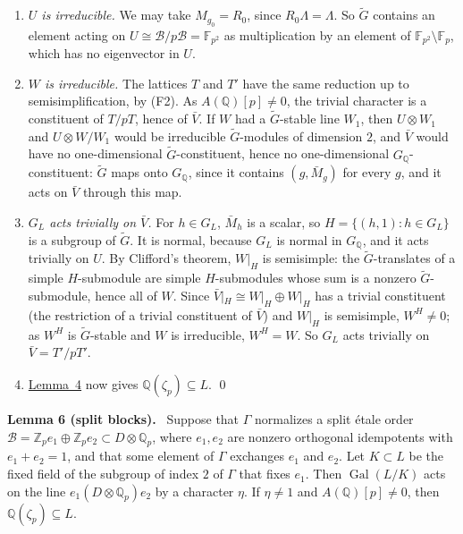 \documentclass[11pt]{article}
\newenvironment{statement}[1]{\par\medskip\noindent\phantomsection\textbf{#1}\ }{\par\medskip}
\newcommand{\Q}{\mathbb Q}
\newcommand{\Z}{\mathbb Z}
\newcommand{\F}{\mathbb F}
\DeclareMathOperator{\Gal}{Gal}
\begin{document}
\begin{enumerate}
\item \emph{\(U\) is irreducible.} We may take \(M_{g_0}=R_0\), since \(R_0\Lambda=\Lambda\). So
\(\tilde G\) contains an element acting on \(U\cong\mathcal B/p\mathcal B=\F_{p^2}\) as multiplication by an
element of \(\F_{p^2}\setminus\F_p\), which has no eigenvector in \(U\).

\item \emph{\(W\) is irreducible.} The lattices \(T\) and \(T'\) have the same reduction up to
semisimplification, by (F2). As \(A(\Q)[p]\neq0\), the trivial character is a constituent of
\(T/pT\), hence of \(\bar V\). If \(W\) had a \(\tilde G\)-stable line \(W_1\), then
\(U\otimes W_1\) and \(U\otimes W/W_1\) would be irreducible \(\tilde G\)-modules of dimension \(2\),
and \(\bar V\) would have no one-dimensional \(\tilde G\)-constituent, hence no one-dimensional
\(G_{\Q}\)-constituent: \(\tilde G\) maps onto \(G_{\Q}\), since it contains \((g,\bar M_g)\) for
every \(g\), and it acts on \(\bar V\) through this map.

\item \emph{\(G_L\) acts trivially on \(\bar V\).} For \(h\in G_L\), \(\bar M_h\) is a scalar, so
\(H=\{(h,1):h\in G_L\}\) is a subgroup of \(\tilde G\). It is normal, because \(G_L\) is normal
in \(G_{\Q}\), and it acts trivially on \(U\). By Clifford's theorem, \(W|_H\) is semisimple: the
\(\tilde G\)-translates of a simple \(H\)-submodule are simple \(H\)-submodules whose sum is a
nonzero \(\tilde G\)-submodule, hence all of \(W\). Since
\(\bar V|_H\cong W|_H\oplus W|_H\) has a trivial constituent (the restriction of a trivial
constituent of \(\bar V\)) and \(W|_H\) is semisimple, \(W^H\neq0\); as \(W^H\) is
\(\tilde G\)-stable and \(W\) is irreducible, \(W^H=W\). So \(G_L\) acts trivially on
\(\bar V=T'/pT'\).

\item \hyperref[lemma-pol]{Lemma~4} now gives \(\Q(\zeta_p)\subseteq L\). \qed
\end{enumerate}

\begin{statement}{Lemma 6 (split blocks).}\label{lemma-split}
Suppose that \(\Gamma\) normalizes a split \'etale order
\(\mathcal B=\Z_pe_1\oplus\Z_pe_2\subset D\otimes\Q_p\), where \(e_1,e_2\) are nonzero orthogonal
idempotents with \(e_1+e_2=1\), and that some element of \(\Gamma\) exchanges \(e_1\) and
\(e_2\). Let \(K\subset L\) be the fixed field of the subgroup of index \(2\) of \(\Gamma\) that
fixes \(e_1\). Then \(\Gal(L/K)\) acts on the line \(e_1(D\otimes\Q_p)e_2\) by a character
\(\eta\). If \(\eta\neq1\) and \(A(\Q)[p]\neq0\), then \(\Q(\zeta_p)\subseteq L\).
\end{statement}
\end{document}
